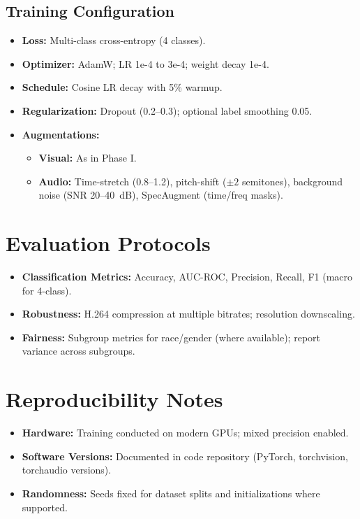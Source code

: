 \subsection{Training Configuration}
\begin{itemize}
    \item \textbf{Loss:} Multi-class cross-entropy (4 classes).
    \item \textbf{Optimizer:} AdamW; LR 1e-4 to 3e-4; weight decay 1e-4.
    \item \textbf{Schedule:} Cosine LR decay with 5\% warmup.
    \item \textbf{Regularization:} Dropout (0.2–0.3); optional label smoothing 0.05.
    \item \textbf{Augmentations:} 
    \begin{itemize}
        \item \textbf{Visual:} As in Phase I.
        \item \textbf{Audio:} Time-stretch (0.8--1.2), pitch-shift ($\pm2$ semitones), background noise (SNR 20--40~dB), SpecAugment (time/freq masks).
    \end{itemize}
\end{itemize}

\section{Evaluation Protocols}
\begin{itemize}
    \item \textbf{Classification Metrics:} Accuracy, AUC-ROC, Precision, Recall, F1 (macro for 4-class).
    \item \textbf{Robustness:} H.264 compression at multiple bitrates; resolution downscaling.
    \item \textbf{Fairness:} Subgroup metrics for race/gender (where available); report variance across subgroups.
\end{itemize}

\section{Reproducibility Notes}
\begin{itemize}
    \item \textbf{Hardware:} Training conducted on modern GPUs; mixed precision enabled.
    \item \textbf{Software Versions:} Documented in code repository (PyTorch, torchvision, torchaudio versions).
    \item \textbf{Randomness:} Seeds fixed for dataset splits and initializations where supported.
\end{itemize}